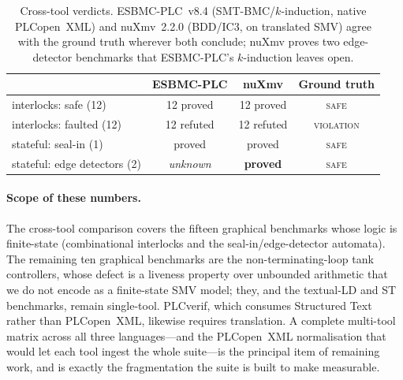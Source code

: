 \begin{table}[t]
  \centering\small
  \caption{Cross-tool verdicts. ESBMC-PLC~v8.4 (SMT-BMC/$k$-induction, native PLCopen~XML) and
           nuXmv~2.2.0 (BDD/IC3, on translated SMV) agree with the ground truth wherever both
           conclude; nuXmv proves two edge-detector benchmarks that ESBMC-PLC's $k$-induction
           leaves open.}
  \label{tab:crosstool}
  \begin{tabular}{@{}lccc@{}}
    \toprule
    & \textbf{ESBMC-PLC} & \textbf{nuXmv} & \textbf{Ground truth}\\
    \midrule
    interlocks: safe (12)        & 12 proved      & 12 proved       & \textsc{safe}\\
    interlocks: faulted (12)     & 12 refuted     & 12 refuted      & \textsc{violation}\\
    stateful: seal-in (1)        & proved         & proved          & \textsc{safe}\\
    stateful: edge detectors (2) & \emph{unknown} & \textbf{proved} & \textsc{safe}\\
    \bottomrule
  \end{tabular}
\end{table}

\paragraph{Scope of these numbers.}
The cross-tool comparison covers the fifteen graphical benchmarks whose logic is finite-state
(combinational interlocks and the seal-in/edge-detector automata). The remaining ten graphical
benchmarks are the non-terminating-loop tank controllers, whose defect is a liveness property
over unbounded arithmetic that we do not encode as a finite-state SMV model; they, and the
textual-LD and ST benchmarks, remain single-tool. PLCverif, which consumes Structured Text
rather than PLCopen~XML, likewise requires translation. A complete multi-tool matrix across all
three languages---and the PLCopen~XML normalisation that would let each tool ingest the whole
suite---is the principal item of remaining work, and is exactly the fragmentation the suite is
built to make measurable.

